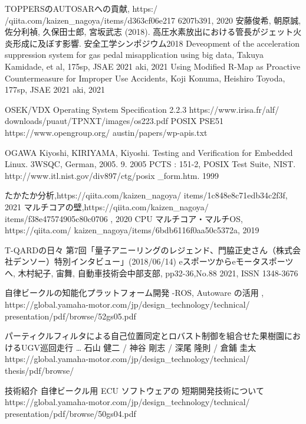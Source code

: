 \documentclass[twocolumn]{article} %
\begin{document}
\begin{thebibliography}{99}
%
 TOPPERSのAUTOSARへの貢献, https:/ /qiita.com/kaizen\_nagoya/items/d363cf06e217 6207b391, 2020
安藤俊希, 朝原誠, 佐分利禎, 久保田士郎, 宮坂武志 (2018). 高圧水素放出における管長がジェット火炎形成に及ぼす影響. 安全工学シンポジウム2018 
 Deveopment of the acceleration suppression system for gas pedal misapplication using big data, Takuya Kamidade, et al, 175sp, JSAE 2021 aki, 2021
 Using Modified R-Map as Proactive Countermeasure for Improper Use Accidents, Koji Konuma, Heishiro Toyoda, 177sp, JSAE 2021 aki, 2021


OSEK/VDX Operating System Specification 2.2.3 https://www.irisa.fr/alf/
downloads/puaut/TPNXT/images/os223.pdf
 POSIX PSE51 https://www.opengroup.org/
austin/papers/wp-apis.txt


 OGAWA Kiyoshi, KIRIYAMA, Kiyoshi. Testing and Verification for Embedded Linux. 3WSQC, German, 2005. 9. 2005 
 PCTS : 151-2, POSIX Test Suite, NIST. http://www.itl.nist.gov/div897/ctg/posix
\_form.htm. 1999 

 たかたか分析,https://qiita.com/kaizen\_nagoya/ items/1c848e8c71edb34c2f3f, 2021
マルチコアの壁,https://qiita.com/kaizen\_nagoya/ items/f38e47574905c80c0706 , 2020
 CPU マルチコア・マルチOS, https://qiita.com/ kaizen\_nagoya/items/6bdb6116f0aa50c5372a, 2019

T-QARDの日々 第7回「量子アニーリングのレジェンド、門脇正史さん（株式会社デンソー）特別インタビュー」(2018/06/14)
 eスポーツからeモータスポーツへ, 木村紀子, 宙舞, 自動車技術会中部支部, pp32-36,No.88 2021, ISSN 1348-3676

 自律ビークルの知能化プラットフォーム開発 -ROS, Autoware の活用 , 
https://global.yamaha-motor.com/jp/design\_technology/technical/
presentation/pdf/browse/52gs05.pdf

 パーティクルフィルタによる自己位置同定とロバスト制御を組合せた果樹園におけるUGV巡回走行 … 石山 健二 / 神谷 剛志 / 深尾 隆則 / 倉鋪 圭太
https://global.yamaha-motor.com/jp/design\_technology/technical/
thesis/pdf/browse/

 技術紹介 自律ビークル用 ECU ソフトウェアの 短期開発技術について
https://global.yamaha-motor.com/jp/design\_technology/technical/
presentation/pdf/browse/50gs04.pdf


\end{thebibliography}
\end{document}
